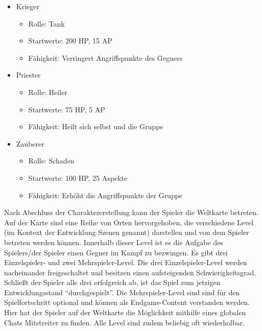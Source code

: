 \begin{itemize}
    \item Krieger
    \begin{itemize}
        \item Rolle:        Tank 
        \item Startwerte:   200 HP, 15 AP 
        \item Fähigkeit:    Verringert Angriffspunkte des Gegners
    \end{itemize}
    \item Priester
    \begin{itemize}
        \item Rolle:        Heiler
        \item Startwerte:   75 HP, 5 AP
        \item Fähigkeit:    Heilt sich selbst und die Gruppe
    \end{itemize}
    \item Zauberer
    \begin{itemize}
        \item Rolle:        Schaden
        \item Startwerte:   100 HP, 25 Aspekte
        \item Fähigkeit:    Erhöht die Angriffspunkte der Gruppe
    \end{itemize}
\end{itemize}

Nach Abschluss der Charaktererstellung kann der Spieler die Weltkarte betreten. Auf der Karte sind eine Reihe von Orten hervorgehoben, die verschiedene Level (im Kontext der Entwicklung Szenen genannt) darstellen und von dem Spieler betreten werden können. Innerhalb dieser Level ist es die Aufgabe des Spielers/der Spieler einen Gegner im Kampf zu bezwingen. Es gibt drei Einzelspieler- und zwei Mehrspieler-Level. Die drei Einzelspieler-Level werden nacheinander freigeschaltet und besitzen einen aufsteigenden Schwierigkeitsgrad. Schließt der Spieler alle drei erfolgreich ab, ist das Spiel zum jetzigen Entwicklungsstand \enquote{durchgespielt}. Die Mehrspieler-Level sind sind für den Spielfortschritt optional und können als Endgame-Content verstanden werden. Hier hat der Spieler auf der Weltkarte die Möglichkeit mithilfe eines globalen Chats Mitstreiter zu finden. Alle Level sind zudem beliebig oft wiederholbar.

